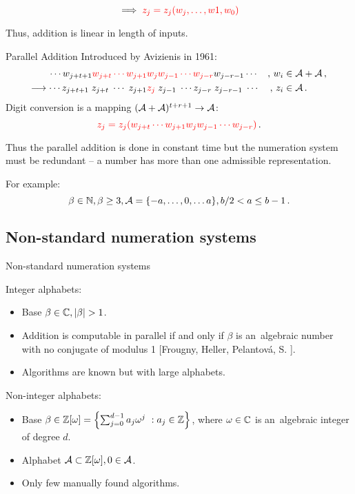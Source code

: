     $$
    \implies \textcolor{red}{z_j=z_j(w_j ,\dots , w1, w_0)}
    $$  
    
    Thus, addition is linear in length of inputs.




    {Parallel Addition}
    Introduced by Avizienis in 1961:
  \begin{align*}
    \cdots w_{j+t+1}\textcolor{red}{w_{j+t} \cdots w_{j+1}}& \textcolor{red}{w_j w_{j-1} \cdots w_{j-r}}w_{j-r-1} \cdots &,\, w_i &\in \mathcal{A} + \mathcal{A}\,,    \\
    \longrightarrow \cdots z_{j+t+1}\;z_{j+t} \; \cdots \; z_{j+1} &\textcolor{red}{z_j} \; z_{j-1}\; \cdots z_{j-r}\;z_{j-r-1}\; \cdots &,\, z_i &\in \mathcal{A}\,.
  \end{align*}
  Digit conversion is a mapping $(\mathcal{A}+\mathcal{A})^{t+r+1} \to \mathcal{A}$:%
  $$
    \textcolor{red}{z_j=z_j(w_{j+t} \cdots w_{j+1}w_j w_{j-1} \cdots w_{j-r})}\,.
  $$
  
  Thus the parallel addition is done in constant time but the numeration system must be redundant -- a number has more than one admissible representation.
  
  
  For example:
  $$
  \beta \in \mathbb{N}, \beta \geq 3, \mathcal{A}=\{-a, \dots, 0, \dots a\}, b/2 <a \leq b-1\,. 
  $$
    


\subsection{Non-standard numeration systems}

    {Non-standard numeration systems}
    
    Integer alphabets:
    \begin{itemize}
        \item Base $\beta \in \CC, |\beta|>1$.
        
        \item Addition is computable in parallel if and only if $\beta$ is an~algebraic number with no conjugate of modulus 1 [Frougny, Heller, Pelantov\'a, S. ].
        
        \item Algorithms are known but with large alphabets.
    \end{itemize}
    
    
    Non-integer alphabets:
    \begin{itemize}
        \item Base $\beta \in \mathbb{Z}[\omega]= \left\{\sum_{j=0}^{d-1} a_j \omega^j\ : a_j \in \mathbb{Z} \right\}$, where $\omega \in \mathbb{C}$ is an~algebraic integer of degree $d$.
        
        \item Alphabet $\mathcal{A} \subset \mathbb{Z}[\omega] , 0\in \mathcal{A}$.
        
        \item Only few manually found algorithms. 
    \end{itemize}
    

